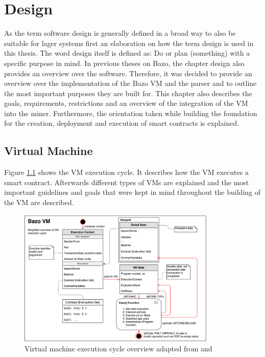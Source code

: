 \chapter{Design} \label{design_chapter}
\thispagestyle{main} %
As the term software design is generally defined in a broad way to also be suitable for lager systems first an elaboration on how the term design is used in this thesis. The word design itself is defined as: Do or plan (something) with a specific purpose in mind. \cite{design_definition} 
In previous theses on Bazo, the chapter design also provides an overview over the software. Therefore, it was decided to provide an overview over the implementation of the  Bazo VM and the parser and to outline the most important purposes they are built for. This chapter also describes the goals, requirements, restrictions and an overview of the integration of the VM into the miner. Furthermore, the orientation taken while building the foundation for the creation, deployment and execution of smart contracts is explained.

\section{Virtual Machine}
Figure \ref{vmexecutioncycle} shows the VM execution cycle. It describes how the VM executes a smart contract. Afterwards different types of VMs are explained and the most important guidelines and goals that were kept in mind throughout the building of the VM are described.

\begin{figure}[H]
	\begin{center}
	\includegraphics[width=0.84\textwidth]{./images/execution-cycle}
	\caption{Virtual machine execution cycle overview adapted from \cite{eth_yellowpaper} and \cite{exec_graphic}}
	\label{vmexecutioncycle}
	\end{center}
\end{figure}

